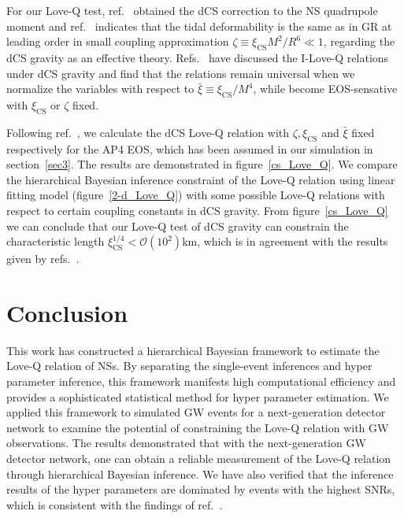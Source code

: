 \documentclass[a4paper,11pt]{article}
\begin{document}
For our Love-Q test, ref.~\cite{Yagi:2013mbt} obtained the dCS correction to the NS quadrupole moment and ref.~\cite{Yagi:2011xp} indicates 
that the tidal deformability is the same as in GR at leading order in small coupling approximation $\zeta \equiv \xi_{\mathrm{CS}} M^2/R^6 \ll 1$, 
regarding the dCS gravity as an effective theory. Refs.~\cite{Yagi_2017, Yagi:2013mbt} have discussed the I-Love-Q relations under dCS gravity 
and find that the relations remain universal when we normalize the variables with respect to $\bar{\xi}\equiv \xi_{\mathrm{CS}}/M^4$, 
while become EOS-sensative with $\xi_{\mathrm{CS}}$ or $\zeta$ fixed. 

Following ref.~\cite{Yagi_2017}, we calculate the dCS Love-Q relation with $\zeta, \xi_{\mathrm{CS}}$ and $\bar{\xi}$ fixed respectively 
for the AP4 EOS, which has been assumed in our simulation in section~\ref{sec3}. The results are demonstrated in figure~\ref{cs_Love_Q}. 
We compare the hierarchical Bayesian inference constraint of the Love-Q relation using linear fitting model (figure~\ref{2-d_Love_Q}) with 
some possible Love-Q relations with respect to certain coupling constants in dCS gravity. From figure~\ref{cs_Love_Q} we can conclude that 
our Love-Q test of dCS gravity can constrain the characteristic length $\xi_{\mathrm{CS}}^{1/4} < \mathcal{O}(10^2)$km, which is in agreement  
with the results given by refs.~\cite{Yagi:2013bca, Yagi:2013awa}.

\section{Conclusion}
\label{sec6}

This work has constructed a hierarchical Bayesian framework to estimate the Love-Q relation of NSs. By separating the single-event inferences and 
hyper parameter inference, this framework manifests high computational efficiency and provides a sophisticated statistical 
method for hyper parameter estimation. We applied this framework to simulated GW events for a next-generation detector network 
to examine the potential of constraining the Love-Q relation with GW observations. The results demonstrated that with the next-generation GW detector network, 
one can obtain a reliable measurement of the Love-Q relation through hierarchical Bayesian inference. We have also verified that the inference results of the 
hyper parameters are dominated by events with the highest SNRs, which is consistent with the findings of ref.~\cite{Lackey:2014fwa}.
\end{document}
